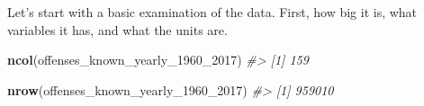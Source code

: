 \documentclass[
  12pt,
]{book}
\newenvironment{Shaded}{\begin{snugshade}}{\end{snugshade}}
\newcommand{\CommentTok}[1]{\textcolor[rgb]{0.37,0.37,0.37}{\textit{#1}}}
\newcommand{\DecValTok}[1]{\textcolor[rgb]{0.06,0.06,0.06}{#1}}
\newcommand{\KeywordTok}[1]{\textcolor[rgb]{0.27,0.27,0.27}{\textbf{#1}}}
\newcommand{\NormalTok}[1]{#1}
\begin{document}
Let's start with a basic examination of the data. First, how big it is, what variables it has, and what the units are.

\begin{Shaded}
\begin{Highlighting}[]
\KeywordTok{ncol}\NormalTok{(offenses\_known\_yearly\_}\DecValTok{1960}\NormalTok{\_}\DecValTok{2017}\NormalTok{)}
\CommentTok{\#> [1] 159}
\end{Highlighting}
\end{Shaded}

\begin{Shaded}
\begin{Highlighting}[]
\KeywordTok{nrow}\NormalTok{(offenses\_known\_yearly\_}\DecValTok{1960}\NormalTok{\_}\DecValTok{2017}\NormalTok{)}
\CommentTok{\#> [1] 959010}
\end{Highlighting}
\end{Shaded}
\end{document}
